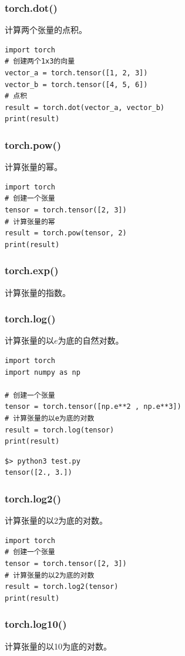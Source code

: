 \subsubsection{torch.dot()}
计算两个张量的点积。
\begin{lstlisting}[style=pythonstyle]
import torch
# 创建两个1x3的向量
vector_a = torch.tensor([1, 2, 3])
vector_b = torch.tensor([4, 5, 6])
# 点积
result = torch.dot(vector_a, vector_b)
print(result)
\end{lstlisting}

\subsubsection{torch.pow()}
计算张量的幂。
\begin{lstlisting}[style=pythonstyle]
import torch
# 创建一个张量
tensor = torch.tensor([2, 3])
# 计算张量的幂
result = torch.pow(tensor, 2)
print(result)
\end{lstlisting}

\subsubsection{torch.exp()}
计算张量的指数。

\subsubsection{torch.log()}
计算张量的以$e$为底的自然对数。
\begin{lstlisting}[style=pythonstyle]
import torch
import numpy as np

# 创建一个张量
tensor = torch.tensor([np.e**2 , np.e**3])
# 计算张量的以e为底的对数
result = torch.log(tensor)
print(result)
\end{lstlisting}
\begin{lstlisting}[style=demostyle,numbers=none]
$> python3 test.py
tensor([2., 3.])
\end{lstlisting}

\subsubsection{torch.log2()}
计算张量的以2为底的对数。
\begin{lstlisting}[style=pythonstyle]
import torch
# 创建一个张量
tensor = torch.tensor([2, 3])
# 计算张量的以2为底的对数
result = torch.log2(tensor)
print(result)
\end{lstlisting}

\subsubsection{torch.log10()}
计算张量的以10为底的对数。


